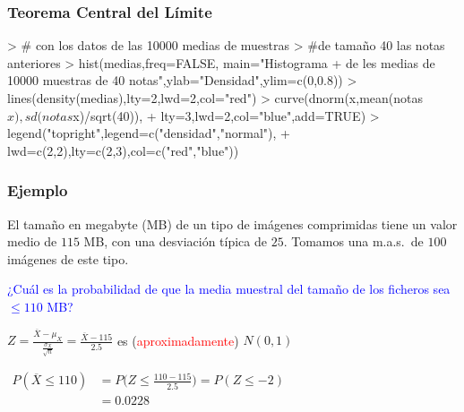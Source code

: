 \documentclass[12pt,t]{beamer}
\newcommand{\red}[1]{\textcolor{red}{#1}}
\newcommand{\blue}[1]{\textcolor{blue}{#1}}
\renewcommand{\leq}{\leqslant}
\theoremstyle{plain}
\theoremstyle{definition}
\begin{document}
\begin{frame}[fragile]
\frametitle{Teorema Central del Límite}
\begin{Schunk}
\begin{Sinput}
> # con los datos de las  10000 medias de muestras
> #de tamaño 40  las notas anteriores
> hist(medias,freq=FALSE, main="Histograma 
+  de les medias de 10000 muestras de 40 notas",ylab="Densidad",ylim=c(0,0.8))
> lines(density(medias),lty=2,lwd=2,col="red")
> curve(dnorm(x,mean(notas$x),sd(notas$x)/sqrt(40)),
+  lty=3,lwd=2,col="blue",add=TRUE)
> legend("topright",legend=c("densidad","normal"),
+  lwd=c(2,2),lty=c(2,3),col=c("red","blue"))
\end{Sinput}
\end{Schunk}

\end{frame}


% 
% 
% 
% 
% 




\begin{frame}
\frametitle{Ejemplo}
\vspace*{-2ex}

El tamaño en megabyte (MB)  de un  tipo de imágenes comprimidas tiene  un  valor medio de   $115$ MB, con una desviación típica de $25$. Tomamos  una m.a.s.\ de $100$ imágenes de este tipo.
\medskip

\blue{¿Cuál es la probabilidad de que la media muestral del tamaño de los ficheros  sea $\leq 110$ MB?}
\medskip

$\displaystyle Z=\frac{\overline{X}-\mu_{X}}{\frac{\sigma_{X}}{\sqrt{n}}}=
\frac{\overline{X}-115}{2.5}$ es (\red{aproximadamente}) $N(0,1)$
\medskip

$\begin{array}{rl}
P(\overline{X}\leq 110)  &\displaystyle= P\Big(Z\leq \frac{110-115}{2.5}\Big)= P(Z\leq -2)\\[2ex]
& \displaystyle=0.0228
\end{array}$


\end{frame}
\end{document}
